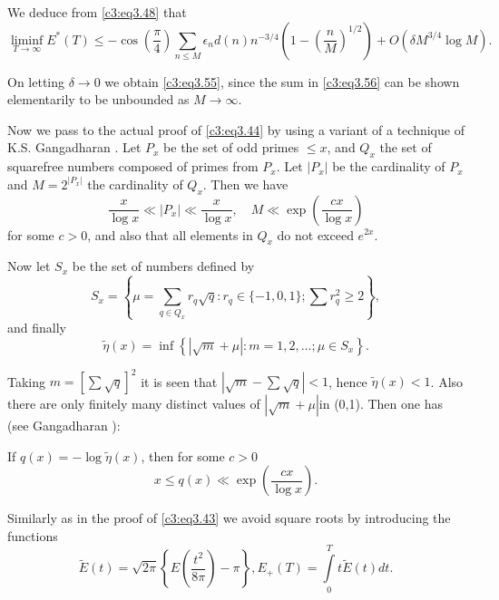 We deduce from \eqref{c3:eq3.48} that
{\fontsize{9}{11}\selectfont
\begin{equation}
  \liminf_{T \to \infty} E^* (T) \leq - \cos \left(\frac{\pi}{4}
  \right) \sum_{n \leq M} \epsilon_n d(n) n^{-3/4} \left(1-
  \left(\frac{n}{M} \right)^{1/2} \right)  + O(\delta M^{3/4} \log
  M).\label{c3:eq3.56} 
\end{equation}}

On letting $\delta \to 0$ we obtain \eqref{c3:eq3.55}, since the sum
in \eqref{c3:eq3.56} can be shown elementarily to be unbounded as $M
\to \infty$.

Now we pass to the actual proof of \eqref{c3:eq3.44} by using a
variant of a technique of K.S. Gangadharan \cite{Gangadharan1}. Let $P_x$ be the
set of odd primes $\leq x$, and $Q_x$ the set of squarefree numbers
composed of primes from $P_x$. Let $|P_x|$ be the cardinality of $P_x$
and $M= 2^{|P_x|}$ the cardinality of $Q_x$. Then we have
\begin{equation}
  \frac{x}{\log x} \ll |P_x| \ll \frac{x}{\log x},\quad M\ll \exp
  \left(\frac{cx}{\log x} \right)\label{c3:eq3.57}
\end{equation}
for some $c > 0$, and also that all elements in $Q_x$ do not exceed
$e^{2x}$. 

Now let $S_x$ be the set of numbers defined by 
$$
S_x = \left\{\mu = \sum_{q \in Q_x} r_q \sqrt{q} : r_q \in \{ -1, 0,
1\}; \sum r_q^2 \geq 2 \right\},
$$
and finally
$$
\tilde{\eta} (x) = \inf \left\{|\sqrt{m} + \mu| : m = 1, 2, \ldots; \mu
\in S_x\right\}.
$$

Taking $m= [\sum\sqrt{q}]^2$ it is seen that $|\sqrt{m} - \sum
\sqrt{q}|< 1$, hence $\tilde{\eta} (x) < 1$. Also there are only
finitely many distinct values of $|\sqrt{m} + \mu|$\pageoriginale in
(0,1). Then one has (see Gangadharan \cite{Gangadharan1}):

\begin{lemma}\label{c3:lem3.6}
  If $q(x)=- \log \tilde{\eta}(x)$, then for some $c>0$
  $$
  x \leq q(x) \ll \exp \left(\frac{cx}{\log x} \right). 
  $$
\end{lemma}

Similarly as in the proof of \eqref{c3:eq3.43} we avoid square roots
by introducing the functions
\begin{equation}
  \tilde{E} (t) = \sqrt{2 \pi} \left\{E \left(\frac{t^2}{8 \pi}
  \right)- \pi  \right\}, E_+ (T) = \int\limits_0^T t\tilde{E} (t)
  dt.\label{c3:eq3.58} 
\end{equation}

